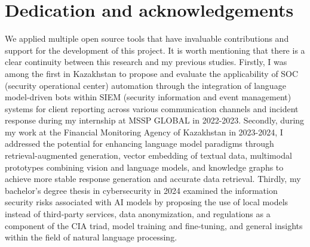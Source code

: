 \chapter{Dedication and acknowledgements}
\begin{SingleSpace}
We applied multiple open source tools that have invaluable contributions and support for the development of this project. It is worth mentioning that there is a clear continuity between this research and my previous studies. Firstly, I was among the first in Kazakhstan to propose and evaluate the applicability of SOC (security operational center) automation through the integration of language model-driven bots within SIEM (security information and event management) systems for client reporting across various communication channels and incident response during my internship at MSSP GLOBAL in 2022-2023. Secondly, during my work at the Financial Monitoring Agency of Kazakhstan in 2023-2024, I addressed the potential for enhancing language model paradigms through retrieval-augmented generation, vector embedding of textual data, multimodal prototypes combining vision and language models, and knowledge graphs to achieve more stable response generation and accurate data retrieval. Thirdly, my bachelor's degree thesis in cybersecurity in 2024 examined the information security risks associated with AI models by proposing the use of local models instead of third-party services, data anonymization, and regulations as a component of the CIA triad, model training and fine-tuning, and general insights within the field of natural language processing.
\end{SingleSpace}
\clearpage
